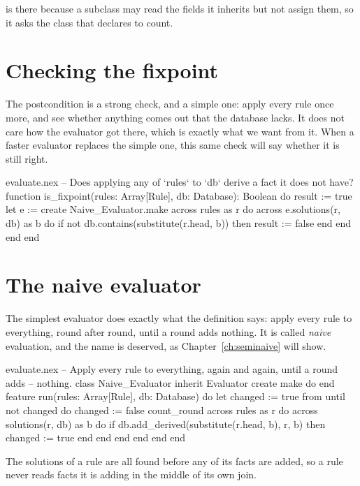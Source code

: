  is there because a subclass may read the fields it
inherits but not assign them, so it asks the class that declares
 to count.

\section{Checking the fixpoint}

The postcondition  is a strong check, and a simple one:
apply every rule once more, and see whether anything comes out that the
database lacks. It does not care how the evaluator got there, which is
exactly what we want from it. When a faster evaluator replaces the simple
one, this same check will say whether it is still right.

\begin{append}{evaluate.nex}
-- Does applying any of `rules` to `db` derive a fact it does not have?
function is_fixpoint(rules: Array[Rule], db: Database): Boolean
do
  result := true
  let e := create Naive_Evaluator.make
  across rules as r do
    across e.solutions(r, db) as b do
      if not db.contains(substitute(r.head, b)) then
        result := false
      end
    end
  end
end
\end{append}

\section{The naive evaluator}

The simplest evaluator does exactly what the definition says: apply every
rule to everything, round after round, until a round adds nothing. It is
called \emph{naive} evaluation, and the name is deserved, as
Chapter~\ref{ch:seminaive} will show.

\begin{append}{evaluate.nex}
-- Apply every rule to everything, again and again, until a round adds
-- nothing.
class Naive_Evaluator inherit Evaluator
create
  make
  do
  end
feature
  run(rules: Array[Rule], db: Database)
  do
    let changed := true
    from until not changed do
      changed := false
      count_round
      across rules as r do
        across solutions(r, db) as b do
          if db.add_derived(substitute(r.head, b), r, b) then
            changed := true
          end
        end
      end
    end
  end
end
\end{append}

The solutions of a rule are all found before any of its facts are added,
so a rule never reads facts it is adding in the middle of its own join.

